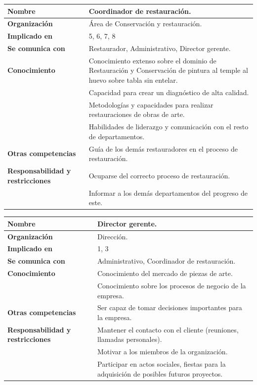 \documentclass[a4paper,11pt]{article}
\begin{document}
			\newpage
			\begin{center}
				\begin{tabular}{| l | p{5.5cm} |}
					\hline
					\textbf{Nombre} & Coordinador de restauración.\\
					\hline
					\textbf{Organización} & Área de Conservación y restauración.\\
					\hline
					\textbf{Implicado en} & 5, 6, 7, 8\\
					\hline
					\textbf{Se comunica con} & Restaurador, Administrativo, Director gerente.\\
					\hline
					\textbf{Conocimiento} & Conocimiento extenso sobre el dominio de
					Restauración y Conservación de pintura al temple al huevo sobre tabla sin entelar.\\
					& Capacidad para crear un diagnóstico de alta calidad.\\
					& Metodologías y capacidades para realizar restauraciones de obras de arte.\\
					& Habilidades de liderazgo y comunicación con el resto de departamentos.\\
					\hline
					\textbf{Otras competencias} & Guía de los demás restauradores en el proceso
					de restauración.\\
					\hline
					\textbf{Responsabilidad y restricciones} & Ocuparse del correcto proceso de restauración.\\
					& Informar a los demás departamentos del progreso de este.\\
					\hline
				\end{tabular}
			\end{center}
			\begin{center}
				\begin{tabular}{| l | p{5.5cm} |}
					\hline
					\textbf{Nombre} & Director gerente.\\
					\hline
					\textbf{Organización} & Dirección.\\
					\hline
					\textbf{Implicado en} & 1, 3\\
					\hline
					\textbf{Se comunica con} & Administrativo, Coordinador de restauración.\\
					\hline
					\textbf{Conocimiento} & Conocimiento del mercado de piezas de arte.\\
					& Conocimiento sobre los procesos de negocio de la empresa.\\
					\hline
					\textbf{Otras competencias} & Ser capaz de tomar decisiones importantes
					para la empresa.\\
					\hline
					\textbf{Responsabilidad y restricciones} & Mantener el contacto con el
					cliente (reuniones, llamadas personales).\\
					& Motivar a los miembros de la organización.\\
					& Participar en actos sociales, fiestas para la adquisición de posibles
					futuros proyectos.\\
					\hline
				\end{tabular}
			\end{center}
		\newpage
\end{document}
